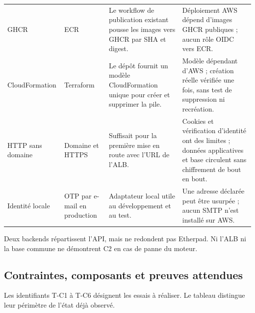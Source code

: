 \begin{longtable}{@{}L{26mm}L{30mm}L{45mm}L{40mm}@{}}
GHCR & ECR & Le workflow de publication existant pousse les images vers GHCR par SHA et digest. & Déploiement AWS dépend d'images GHCR publiques ; aucun rôle OIDC vers ECR. \\
Cloud\-Formation & Terraform & Le dépôt fournit un modèle CloudFormation unique pour créer et supprimer la pile. & Modèle dépendant d'AWS ; création réelle vérifiée une fois, sans test de suppression ni recréation. \\
HTTP sans domaine & Domaine et HTTPS & Suffisait pour la première mise en route avec l'URL de l'ALB. & Cookies et vérification d'identité ont des limites ; données applicatives et base circulent sans chiffrement de bout en bout. \\
Identité locale & OTP par e-mail en production & Adaptateur local utile au développement et au test. & Une adresse déclarée peut être usurpée ; aucun SMTP n'est installé sur AWS. \\
\bottomrule
\end{longtable}

Deux backends répartissent l'API, mais ne redondent pas Etherpad. Ni l'ALB ni la base commune ne démontrent C2 en cas de panne du moteur.

\subsection{Contraintes, composants et preuves attendues}

Les identifiants T-C1 à T-C6 désignent les essais à réaliser. Le tableau distingue leur périmètre de l'état déjà observé.


